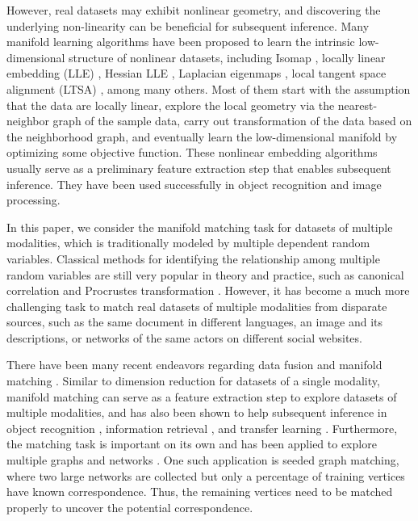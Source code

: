 \documentclass[times,twocolumn,final]{elsarticle}
\begin{document}
However, real datasets may exhibit nonlinear geometry, and discovering the underlying non-linearity can be beneficial for subsequent inference. Many manifold learning algorithms have been proposed to learn the intrinsic low-dimensional structure of nonlinear datasets, including Isomap \citep{TenenbaumSilvaLangford2000, SilvaTenenbaum2003}, locally linear embedding (LLE) \citep{SaulRoweis2000, RoweisSaul2003}, Hessian LLE \citep{DonohoGrimes2003}, Laplacian eigenmaps \citep{BelkinNiyogi2003, HeEtAl2005}, local tangent space alignment (LTSA) \citep{ZhangZha2004, ZhangWangZha2012}, among many others. Most of them start with the assumption that the data are locally linear, explore the local geometry via the nearest-neighbor graph of the sample data, carry out transformation of the data based on the neighborhood graph, and eventually learn the low-dimensional manifold by optimizing some objective function. These nonlinear embedding algorithms usually serve as a preliminary feature extraction step that enables subsequent inference. They have been used successfully in object recognition and image processing. 

In this paper, we consider the manifold matching task for datasets of multiple modalities, which is traditionally modeled by multiple dependent random variables. Classical methods for identifying the relationship among multiple random variables are still very popular in theory and practice, such as canonical correlation \citep{Hotelling1936, Kettenring1971, Hardoon2004} and Procrustes transformation \citep{Sibson1978, Sibson1979, GoldbergRitov2009, GowerProcrustesBook}. However, it has become a much more challenging task to match real datasets of multiple modalities from disparate sources, such as the same document in different languages, an image and its descriptions, or networks of the same actors on different social websites. 

There have been many recent endeavors regarding data fusion and manifold matching \citep{LafonKellerCoifman2006, WangMahadevan2008, WangMahadevan2012, SharmaKumar2012, PriebeMarchette2012, SunPriebeTang2013, ShenSunTangPriebe2014}. Similar to dimension reduction for datasets of a single modality, manifold matching can serve as a feature extraction step to explore datasets of multiple modalities, and has also been shown to help subsequent inference in object recognition \citep{KimKittlerCipolla2007}, information retrieval \citep{SunPriebe2012}, and transfer learning \citep{PanYang2010}. Furthermore, the matching task is important on its own and has been applied to explore multiple graphs and networks \citep{ConteEtAl2004, FioriEtAl2013, LyzinskiFishkindPriebe2014, JoshuaEtAl2015, LyzinskiFishkindPriebe2016}. One such application is seeded graph matching, where two large networks are collected but only a percentage of training vertices have known correspondence. Thus, the remaining vertices need to be matched properly to uncover the potential correspondence.
\end{document}
